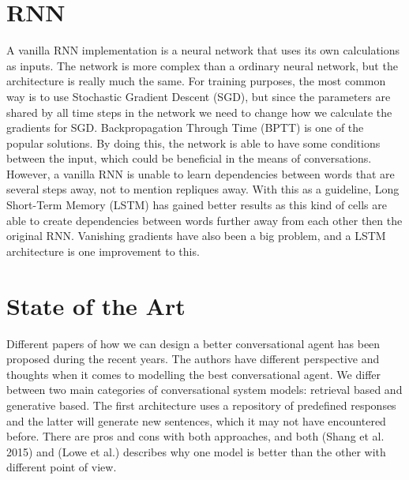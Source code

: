 \documentclass{article} %
\begin{document}
\section{RNN}
A vanilla RNN implementation is a neural network that uses its own calculations as inputs. The network is more complex than a ordinary neural network, but the architecture is really much the same. For training purposes, the most common way is to use Stochastic Gradient Descent (SGD), but since the parameters are shared by all time steps in the network we need to change how we calculate the gradients for SGD. Backpropagation Through Time (BPTT) is one of the popular solutions. By doing this, the network is able to have some conditions between the input, which could be beneficial in the means of conversations. However, a vanilla RNN is unable to learn dependencies between words that are several steps away, not to mention repliques away. With this as a guideline, Long Short-Term Memory (LSTM) has gained better results as this kind of cells are able to create dependencies between words further away from each other then the original RNN. Vanishing gradients have also been a big problem, and a LSTM architecture is one improvement to this.

\section{State of the Art}
Different papers of how we can design a better conversational agent has been proposed during the recent years. The authors have different perspective and thoughts when it comes to modelling the best conversational agent. We differ between two main categories of conversational system models: retrieval based and generative based. The first architecture uses a repository of predefined responses and the latter will generate new sentences, which it may not have encountered before. There are pros and cons with both approaches, and both (Shang et al. 2015) and (Lowe et al.) describes why one model is better than the other with different point of view. 
\end{document}
